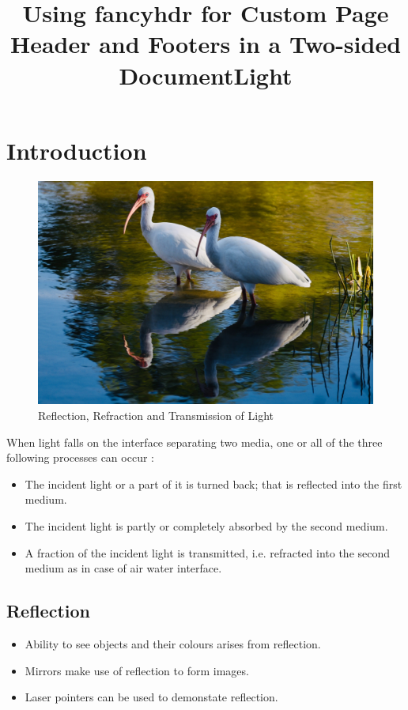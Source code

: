 \documentclass[12pt]{book}
\title{Using fancyhdr for Custom Page Header and Footers in a Two-sided Document}
\begin{document}
\title{Light}
\setcounter{page}{1}
\maketitle
\chapter{Introduction}
\begin{figure}[htpb]
    \centering
    \includegraphics[width=0.8\linewidth]{../pond_reflection.jpg}
    \caption{Reflection, Refraction and Transmission of Light}%
    \label{fig:}
\end{figure}


When light falls on the interface separating two media, one or all
of the three following processes can occur :
\begin{itemize}
    \item The incident light or a part of it is turned back; that is reflected
into the first medium.
\item The incident light is partly or completely absorbed by the second
medium.
\item A fraction of the incident light is transmitted, i.e. refracted into
the second medium as in case of air water interface.
\end{itemize}

\section{Reflection}
\begin{itemize}
    \item Ability to see objects and their colours arises from reflection.
\item Mirrors make use of reflection to form images.
\item Laser pointers can be used to demonstate reflection.
\end{itemize}
\end{document}
